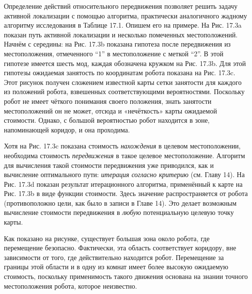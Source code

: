 \documentclass[10pt,a4paper]{article}
\begin{document}
Определение действий относительного передвижения позволяет решить задачу активной локализации с помощью алгоритма, практически аналогичного жадному алгоритму исследования в Таблице 17.1. Опишем его на примере. На Рис. 17.3a показан путь активной локализации и несколько помеченных местоположений. Начнём с середины: на Рис. 17.3b показана гипотеза после передвижения из местоположения, отмеченного “1” в местоположение с меткой “2”. В этой гипотезе имеется шесть мод, каждая обозначена кружком на Рис. 17.3b. Для этой гипотезы ожидаемая занятость  по координатам робота показана на Рис. 17.3c. Этот рисунок получен сложением известной карты сетки занятости для каждого из положений робота, взвешенных соответствующими вероятностями. Поскольку робот не имеет чёткого понимания своего положения, знать занятости местоположений он не может, отсюда и «нечёткость» карты ожидаемой стоимости. Однако, с большой вероятностью робот находится в зоне, напоминающей коридор, и она проходима.

Хотя на Рис. 17.3c показана стоимость \textit{нахождения} в целевом местоположении, необходима стоимость \textit{передвижения} в такое целевое местоположение. Алгоритм для вычисления такой стоимости передвижения уже приводился, как и вычисление оптимального пути: \textit{итерация согласно критерию} (см. Главу 14). На Рис. 17.3d показан результат итерационного алгоритма, применённый к карте на Рис. 17.3b в виде функции стоимости. Здесь значение распространяется от робота (противоположно цели, как было в записи в Главе 14). Это делает возможным вычисление стоимости передвижения в \textit{любую} потенциальную целевую точку карты.

Как показано на рисунке, существует большая зона около робота, где перемещение безопасно. Фактически, эта область соответствует коридору, вне зависимости от того, где действительно находится робот. Перемещение за границы этой области и в одну из комнат имеет более высокую ожидаемую стоимость, поскольку применимость такого движения основана на знании точного местоположения робота, которое неизвестно.
\end{document}
